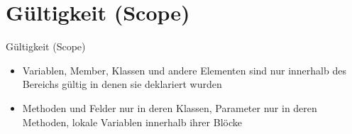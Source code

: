 \section{Gültigkeit (Scope)}
\begin{frame}{Gültigkeit (Scope)}
	\begin{itemize}
		\item Variablen, Member, Klassen und andere Elementen sind nur innerhalb des Bereichs gültig in denen sie deklariert wurden
		\item Methoden und Felder nur in deren Klassen, Parameter nur in deren Methoden, lokale Variablen innerhalb ihrer Blöcke
	\end{itemize}
	
\end{frame}


